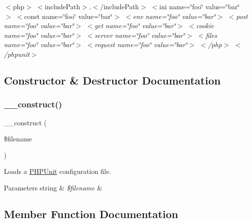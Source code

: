 {\ttfamily  $<$php$>$ $<$include\+Path$>$.$<$/include\+Path$>$ $<$ini name=\char`\"{}foo\char`\"{} value=\char`\"{}bar\char`\"{}$>$ $<$const name=\char`\"{}foo\char`\"{} value=\char`\"{}bar\char`\"{}$>$ {\itshape  $<$env name=\char`\"{}foo\char`\"{} value=\char`\"{}bar\char`\"{}$>$ $<$post name=\char`\"{}foo\char`\"{} value=\char`\"{}bar\char`\"{}$>$ $<$get name=\char`\"{}foo\char`\"{} value=\char`\"{}bar\char`\"{}$>$ $<$cookie name=\char`\"{}foo\char`\"{} value=\char`\"{}bar\char`\"{}$>$ $<$server name=\char`\"{}foo\char`\"{} value=\char`\"{}bar\char`\"{}$>$ $<$files name=\char`\"{}foo\char`\"{} value=\char`\"{}bar\char`\"{}$>$ $<$request name=\char`\"{}foo\char`\"{} value=\char`\"{}bar\char`\"{}$>$ $<$/php$>$ $<$/phpunit$>$  }}

\subsection{Constructor \& Destructor Documentation}
\mbox{\label{class_p_h_p_unit___util___configuration_a3387125924c13e72878c47ecad75faca}} 
\subsubsection{\texorpdfstring{\+\_\+\+\_\+construct()}{\_\_construct()}}
{\footnotesize\ttfamily \+\_\+\+\_\+construct (\begin{DoxyParamCaption}\item[{}]{\$filename }\end{DoxyParamCaption})\hspace{0.3cm}{\ttfamily [protected]}}

Loads a \mbox{\hyperlink{namespace_p_h_p_unit}{P\+H\+P\+Unit}} configuration file.


\begin{DoxyParams}[1]{Parameters}
string & {\em \$filename} & \\
\hline
\end{DoxyParams}


\subsection{Member Function Documentation}
\mbox{\label{class_p_h_p_unit___util___configuration_a36eca2931cea673827f30310453d2afb}} 
